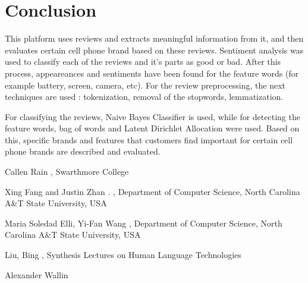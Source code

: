 \documentclass[11pt]{article}
\begin{document}
\section{Conclusion}
This platform uses reviews and extracts meaningful information from it, and then evaluates certain cell phone brand based on these reviews. Sentiment analysis was used to classify each of the reviews and it's parts as good or bad. After this process, appeareances and sentiments have been found for the feature words (for example battery, screen, camera, etc). For the review preprocessing, the next techniques are used : tokenization, removal of the stopwords, lemmatization. \par

For classifying the reviews, Naive Bayes Classifier is used, while for detecting the feature words, bag of words and Latent Dirichlet Allocation were used. Based on this, specific brands and features that customers find important for certain cell phone brands are described and evaluated.  

\begin{thebibliography}{}

Callen Rain
,
\newblock Swarthmore College


Xing Fang and Justin Zhan
.
,
\newblock Department of Computer Science, North Carolina A\&T State University, USA


Maria Soledad Elli, Yi-Fan Wang
,
\newblock Department of Computer Science, North Carolina A\&T State University, USA


Liu, Bing
,
\newblock Synthesis Lectures on Human Language Technologies


Alexander Wallin




\end{thebibliography}
\end{document}

